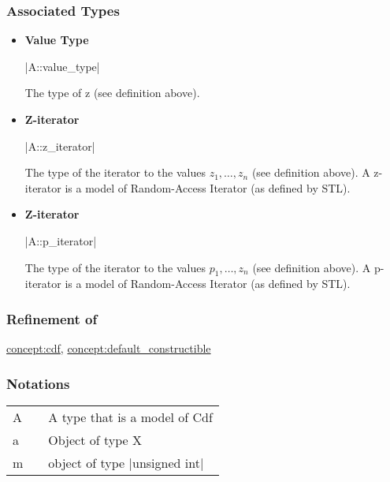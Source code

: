 \documentclass[12pt,twoside]{report}
\begin{document}
\htmlrule[CLEAR=all]  \subsubsection*{Associated Types}
\begin{itemize}
\item {\bf Value Type}

  |A::value_type|

  The type of z (see definition above).

\item {\bf Z-iterator}

  |A::z_iterator|

  The type of the iterator to the values $z_1,\ldots,z_n$ (see definition above). A z-iterator is a model of Random-Access Iterator (as defined by STL).

\item {\bf Z-iterator}

  |A::p_iterator|

  The type of the iterator to the values $p_1,\ldots,z_n$ (see definition above). A p-iterator is a model of Random-Access Iterator (as defined by STL).


\end{itemize}


\htmlrule[CLEAR=all]  \subsubsection*{Refinement of}
\hyperref{CDF}{CDF}{}{concept:cdf}, \hyperref{Default Constructitble}{Default Constructitble}{}{concept:default_constructible}


\htmlrule[CLEAR=all]  \subsubsection*{Notations}

\begin{tabular}[!h]{l l p{10cm}}
A & & A type that is a model of Cdf\\
a & & Object of type X\\
m & & object of type |unsigned int|\\
\end{tabular}

 
\end{document}
